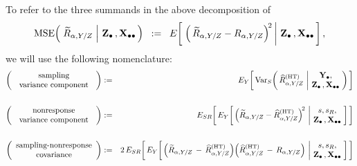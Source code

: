 \vskip 0.75cm
\noindent
To refer to the three summands in the above decomposition of
\begin{equation*}
\textnormal{MSE}\!\left(\,
    \left.
    \widetilde{R}_{\alpha,Y/Z}
    \;\right\vert\,
    \mathbf{Z}_{\bullet}\,,\mathbf{X}_{\bullet\bullet}
    \,\right)
\;\; := \;\;
    E\!\left[\,
        \left.
        \left(\,\widetilde{R}_{\alpha,Y/Z} - R_{\alpha,Y/Z}\right)^{\!2}
        \,\right\vert\,
        \mathbf{Z}_{\bullet}\,,\mathbf{X}_{\bullet\bullet}
        \,\right],
\end{equation*}
we will use the following nomenclature:
\vskip 0.01cm
\begin{eqnarray*}
\left(\begin{array}{c}
    \textnormal{sampling}
    \\
    \textnormal{\;\,variance component\;\,}
    \end{array}\right)
& := &
    E_{Y}\!\left[\,
    \Var_{S}\!\left(\,
        \widehat{R}^{\textnormal{(HT)}}_{\alpha,Y/Z}
        \,\left\vert\!
        \begin{array}{c} \Ydot, \\ \Zdot\,,\Xobs \end{array}
        \right.
        \!\!\right)
        \,\right]
\\ \\
\left(\begin{array}{c}
    \textnormal{nonresponse}
    \\
    \textnormal{\;\,variance component\;\,}
    \end{array}\right)
& := &
    E_{SR}\!\left[\,
    E_{Y}\!\left[\,
        \left(\widetilde{R}_{\alpha,Y/Z} - \widehat{R}^{\textnormal{(HT)}}_{\alpha,Y/Z}\right)^{\!2}
        \,\left\vert\!
        \begin{array}{c} s,s_{R}, \\ \Zdot\,,\Xobs \end{array}
        \right.
        \!\!\right]
        \,\right]
\\ \\
\left(\begin{array}{c}
    \textnormal{sampling-nonresponse}
    \\
    \textnormal{covariance}
    \end{array}\right)
& := &
    2\,
    E_{SR}\!\left[\,
    E_{Y}\!\left[\,
        \left(\widetilde{R}_{\alpha,Y/Z} \,-\, \widehat{R}^{\textnormal{(HT)}}_{\alpha,Y/Z}\right)
        \!
        \left(\widehat{R}^{\textnormal{(HT)}}_{\alpha,Y/Z} \,-\, R_{\alpha,Y/Z}\right)
        \,\left\vert\!
        \begin{array}{c} s,s_{R}, \\ \Zdot\,,\Xobs \end{array}
        \right.
        \!\!\right]
        \,\right]
\end{eqnarray*}


